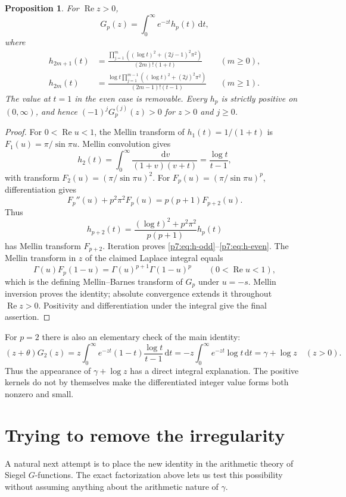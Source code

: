\documentclass[11pt,a4paper]{article}
\newtheorem{proposition}[theorem]{Proposition}
\theoremstyle{definition}
\theoremstyle{remark}
\newcommand{\dd}{\,\mathrm d}
\numberwithin{equation}{section}
\begin{document}
\begin{proposition}
\label{p7:prop:positive-meijer}
For $\operatorname{Re}z>0$,
\[
 G_p(z)=\int_0^\infty e^{-zt}h_p(t)\dd t,
\]
where
\begin{align}
 h_{2m+1}(t)
 &=\frac{\displaystyle\prod_{j=1}^{m}
       ((\log t)^2+(2j-1)^2\pi^2)}
       {(2m)!(1+t)} &&(m\ge0),\label{p7:eq:h-odd}\\
 h_{2m}(t)
 &=\frac{\displaystyle\log t\prod_{j=1}^{m-1}
       ((\log t)^2+(2j)^2\pi^2)}
       {(2m-1)!(t-1)} &&(m\ge1).\label{p7:eq:h-even}
\end{align}
The value at $t=1$ in the even case is removable. Every $h_p$ is strictly
positive on $(0,\infty)$, and hence
$(-1)^jG_p^{(j)}(z)>0$ for $z>0$ and $j\ge0$.
\end{proposition}
\begin{proof}
For $0<\operatorname{Re}u<1$, the Mellin transform of
$h_1(t)=1/(1+t)$ is $F_1(u)=\pi/\sin\pi u$. Mellin convolution gives
\[
 h_2(t)=\int_0^\infty\frac{\dd v}{(1+v)(v+t)}
       =\frac{\log t}{t-1},
\]
with transform $F_2(u)=(\pi/\sin\pi u)^2$. For
$F_p(u)=(\pi/\sin\pi u)^p$, differentiation gives
\[
 F_p''(u)+p^2\pi^2F_p(u)=p(p+1)F_{p+2}(u).
\]
Thus
\[
 h_{p+2}(t)
 =\frac{(\log t)^2+p^2\pi^2}{p(p+1)}h_p(t)
\]
has Mellin transform $F_{p+2}$. Iteration proves
\eqref{p7:eq:h-odd}--\eqref{p7:eq:h-even}. The Mellin transform in $z$ of the
claimed Laplace integral equals
\[
 \Gamma(u)F_p(1-u)
 =\Gamma(u)^{p+1}\Gamma(1-u)^p
 \qquad(0<\operatorname{Re}u<1),
\]
which is the defining Mellin--Barnes transform of $G_p$ under $u=-s$.
Mellin inversion proves the identity; absolute convergence extends it
throughout $\operatorname{Re}z>0$. Positivity and differentiation under
the integral give the final assertion.
\end{proof}

For $p=2$ there is also an elementary check of the main identity:
\[
 (z+\theta)G_2(z)
 =z\int_0^\infty e^{-zt}(1-t)\frac{\log t}{t-1}\dd t
 =-z\int_0^\infty e^{-zt}\log t\dd t
 =\gamma+\log z \quad(z>0).
\]
Thus the appearance of $\gamma+\log z$ has a direct integral explanation.
The positive kernels do not by themselves make the differentiated
integer value forms both nonzero and small.

\section{Trying to remove the irregularity}
\label{p7:sec:borel}

A natural next attempt is to place the new identity in the arithmetic
theory of Siegel $G$-functions. The exact factorization above lets us
test this possibility without assuming anything about the arithmetic
nature of $\gamma$.
\end{document}
